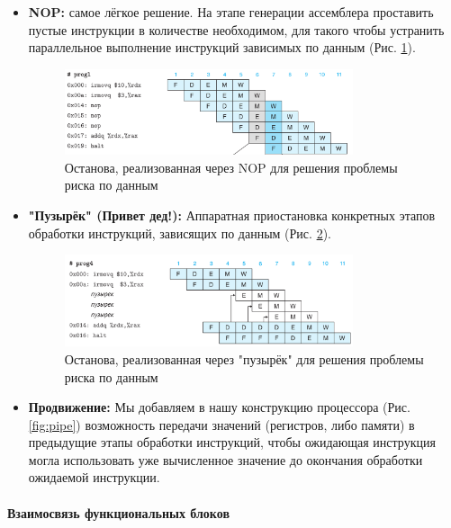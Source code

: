 \documentclass[12pt,a4paper]{article}
\begin{document}
\begin{itemize}
    \item \textbf{NOP:} самое лёгкое решение. На этапе генерации ассемблера проставить пустые инструкции в количестве необходимом, для такого чтобы устранить параллельное выполнение инструкций зависимых по данным (Рис. \ref{fig:nop}).
    \begin{figure}[ht!]
        \centering
        \includegraphics[width=0.8\textwidth]{nop.png}
        \caption{Останова, реализованная через NOP для решения проблемы риска по данным}
        \label{fig:nop}
    \end{figure}

    \item \textbf{"Пузырёк" (Привет дед!): } Аппаратная приостановка конкретных этапов обработки инструкций, зависящих по данным (Рис. \ref{fig:babble}).
    \begin{figure}[ht!]
        \centering
        \includegraphics[width=0.8\textwidth]{babble.png}
        \caption{Останова, реализованная через "пузырёк" для решения проблемы риска по данным}
        \label{fig:babble}
    \end{figure}

    \item \textbf{Продвижение: } Мы добавляем в нашу конструкцию процессора (Рис. \ref{fig:pipe}) возможность передачи значений (регистров, либо памяти) в предыдущие этапы обработки инструкций, чтобы ожидающая инструкция могла использовать уже вычисленное значение до окончания обработки ожидаемой инструкции.
\end{itemize}

\paragraph{Взаимосвязь функциональных блоков}
\indent
\end{document}
